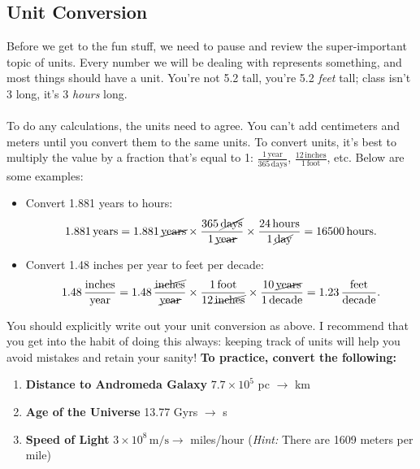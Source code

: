 \documentclass[11pt]{article}
\begin{document}
\subsection{Unit Conversion}
Before we get to the fun stuff, we need to pause and review the super-important
topic of units. Every number we will be dealing with represents something, and 
most things should have a unit. You're not 5.2 tall, you're 5.2 \textit{feet} tall; class isn't 3 long, it's 3 \textit{hours} long. 
\\ \\ \noindent
To do any calculations, the units need to agree. 
You can't add centimeters and meters until you convert them to the same units. 
To convert units, it's best to multiply the value by a fraction that's equal to 1: $\frac{1 \,\mathrm{year}}{365 \,\mathrm{days}}$, $\frac{12 \,\mathrm{inches}}{1 \,\mathrm{foot}}$, etc. Below are some examples:
\begin{itemize}
    \item Convert 1.881 years to hours: $$ 1.881 \, \mathrm{years} = 1.881 \, \cancel{\mathrm{years}} \times \frac{365 \, \cancel{\mathrm{days}}}{1 \, \cancel{\mathrm{year}}} \times \frac{24 \, \mathrm{hours}}{1 \, \cancel{\mathrm{day}}} =  16500 \, \mathrm{hours}. $$
    \item Convert 1.48 inches per year to feet per decade: $$ 1.48 \, \frac{\mathrm{inches}}{\mathrm{year}} =  1.48 \, \frac{\cancel{\mathrm{inches}}}{\cancel{\mathrm{year}}} \times \frac{1 \, \mathrm{foot}}{12 \, \cancel{\mathrm{inches}}} \times \frac{10 \, \cancel{\mathrm{years}}}{1 \, \mathrm{decade}} = 1.23 \, \frac{\mathrm{feet}}{\mathrm{decade}}. $$
\end{itemize}
\noindent
You should explicitly write out your unit conversion as above.  I recommend that you get into the habit of doing this always: keeping track of units will help you avoid mistakes and retain your sanity! \textbf{To practice, convert the following:}

\begin{enumerate}
    \item \textbf{Distance to Andromeda Galaxy} $7.7 \times 10^5$ pc $\rightarrow$ km
    \item \textbf{Age of the Universe} 13.77 Gyrs $\rightarrow$ s
    \item \textbf{Speed of Light} $3 \times 10^8 \, \mathrm{m/s} \rightarrow$ miles/hour (\textit{Hint:} There are 1609 meters per mile)
\end{enumerate}
\end{document}
